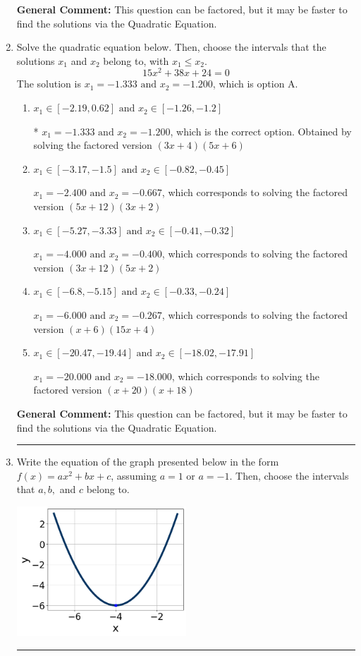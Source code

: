 \documentclass{extbook}[14pt]
\newcommand{\litem}[1]{\item #1

\rule{\textwidth}{0.4pt}}
\begin{document}
\begin{enumerate}
{\textbf{General Comment:} This question can be factored, but it may be faster to find the solutions via the Quadratic Equation.
}
\litem{
Solve the quadratic equation below. Then, choose the intervals that the solutions $x_1$ and $x_2$ belong to, with $x_1 \leq x_2$.
\[ 15x^{2} +38 x + 24 = 0 \]The solution is \( x_1 = -1.333 \text{ and } x_2 = -1.200 \), which is option A.\begin{enumerate}[label=\Alph*.]
\item \( x_1 \in [-2.19, 0.62] \text{ and } x_2 \in [-1.26, -1.2] \)

* $x_1 = -1.333 \text{ and } x_2 = -1.200$, which is the correct option. Obtained by solving the factored version $(3x + 4)(5x + 6)$
\item \( x_1 \in [-3.17, -1.5] \text{ and } x_2 \in [-0.82, -0.45] \)

$x_1 = -2.400 \text{ and } x_2 = -0.667$, which corresponds to solving the factored version $(5x + 12)(3x + 2)$
\item \( x_1 \in [-5.27, -3.33] \text{ and } x_2 \in [-0.41, -0.32] \)

$x_1 = -4.000 \text{ and } x_2 = -0.400$, which corresponds to solving the factored version $(3x + 12)(5x + 2)$
\item \( x_1 \in [-6.8, -5.15] \text{ and } x_2 \in [-0.33, -0.24] \)

$x_1 = -6.000 \text{ and } x_2 = -0.267$, which corresponds to solving the factored version $(x + 6)(15x + 4)$
\item \( x_1 \in [-20.47, -19.44] \text{ and } x_2 \in [-18.02, -17.91] \)

$x_1 = -20.000 \text{ and } x_2 = -18.000$, which corresponds to solving the factored version $(x + 20)(x + 18)$
\end{enumerate}

\textbf{General Comment:} This question can be factored, but it may be faster to find the solutions via the Quadratic Equation.
}
\litem{
Write the equation of the graph presented below in the form $f(x)=ax^2+bx+c$, assuming  $a=1$ or $a=-1$. Then, choose the intervals that $a, b,$ and $c$ belong to.

\begin{center}
    \includegraphics[width=0.5\textwidth]{../Figures/quadraticGraphToEquationB.png}
\end{center}


}
\end{enumerate}
\end{document}

